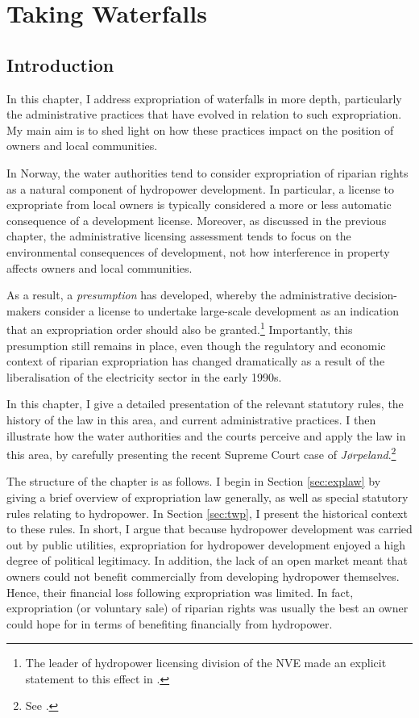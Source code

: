 \chapter{Taking Waterfalls}\label{chap:4}

\section{Introduction}\label{sec:intro4}

In this chapter, I address expropriation of waterfalls in more depth, particularly the administrative practices that have evolved in relation to such expropriation. My main aim is to shed light on how these practices impact on the position of owners and local communities.

In Norway, the water authorities tend to consider expropriation of riparian rights as a natural component of hydropower development. In particular, a license to expropriate from local owners is typically considered a more or less automatic consequence of a development license. Moreover, as discussed in the previous chapter, the administrative licensing assessment tends to focus on the environmental consequences of development, not how interference in property affects owners and local communities.

As a result, a {\it presumption} has
developed, whereby the administrative decision-makers consider a license to undertake large-scale development as an indication that an expropriation order should also be granted.\footnote{The leader of hydropower licensing division of the NVE made an explicit statement to this effect in \cite{flatby08}.} Importantly, this presumption still remains in place, even though the regulatory and economic context of riparian expropriation has changed dramatically as a result of the liberalisation of the electricity sector in the early 1990s. 

In this chapter, I give a detailed presentation of the relevant statutory rules, the history of the law in this area, and current administrative practices. I then illustrate how the water authorities and the courts perceive and apply the law in this area, by carefully presenting the recent Supreme Court case of {\it Jørpeland}.\footnote{See \cite{jorpeland11}.}

The structure of the chapter is as follows. I begin in Section \ref{sec:explaw} by giving a brief overview of expropriation law generally, as well as special statutory rules relating to hydropower. In Section \ref{sec:twp}, I present the historical context to these rules. In short, I argue that because hydropower development was carried out by public utilities, expropriation for hydropower development enjoyed a high degree of political legitimacy. In addition, the lack of an open market meant that owners could not benefit commercially from developing hydropower themselves. Hence, their financial loss following expropriation was limited. In fact, expropriation (or voluntary sale) of riparian rights was usually the best an owner could hope for in terms of benefiting financially from hydropower.

